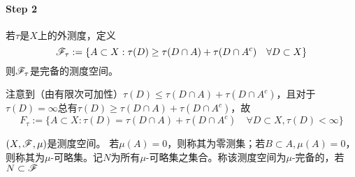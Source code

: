 \documentclass{ctexbook}
\begin{document}
\paragraph{Step 2}
\begin{Thm}[Caratheodory]
  若$\tau$是$X$上的外测度，定义
  \[\mathscr{F}_{\tau}:=\{A\subset X:\tau(D)\geq \tau(D\cap A)+\tau(D\cap A^{c})\quad \forall D\subset X\}\]
  则$\mathscr{F}_{\tau}$是完备的测度空间。
\end{Thm}

注意到（由有限次可加性）$\tau(D)\leq \tau(D\cap A)+\tau(D\cap A^{c})$，且对于$\tau(D)=\infty$总有$\tau(D)\geq \tau(D\cap A)+\tau(D\cap A^{c})$，故
\[F_{\tau}:=\{A\subset X:\tau(D)= \tau(D\cap A)+\tau(D\cap A^{c})\quad \forall D\subset X,\tau(D)<\infty\}\]

\begin{Def}[完备性]
  $(X,\mathscr{F},\mu)$是测度空间。 若$\mu(A)=0$，则称其为零测集；若$B\subset A,\mu(A)=0$，则称其为$\mu$-可略集。记$N$为所有$\mu$-可略集之集合。称该测度空间为$\mu$-完备的，若$N\subset \mathscr{F}$
\end{Def}
\end{document}
